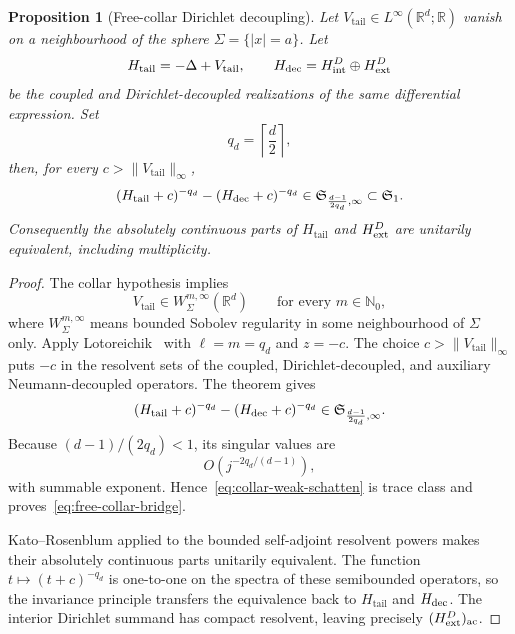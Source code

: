 \documentclass[11pt]{article}
\newcommand{\R}{\mathbb R}
\newcommand{\N}{\mathbb N}
\newcommand{\TC}{\mathfrak S_1}
\newcommand{\ac}{\mathrm{ac}}
\newtheorem{proposition}[theorem]{Proposition}
\theoremstyle{definition}
\theoremstyle{remark}
\begin{document}
\begin{proposition}[Free-collar Dirichlet decoupling]\label{prop:free-collar}
Let $V_{\mathrm{tail}}\in L^\infty(\R^d;\R)$ vanish on a neighbourhood of the sphere $\Sigma=\{|x|=a\}$.  Let
\begin{equation}
 H_{\mathrm{tail}}=-\Delta+V_{\mathrm{tail}},
 \qquad
 H_{\rm dec}=H_{\rm int}^D\oplus H_{\rm ext}^D
 \label{eq:free-collar-operators}
\end{equation}
be the coupled and Dirichlet-decoupled realizations of the same differential expression.  Set
\begin{equation}
 q_d=\left\lceil\frac d2\right\rceil,
 \label{eq:free-collar-power}
\end{equation}
then, for every $c>\|V_{\mathrm{tail}}\|_\infty$,
\begin{equation}
 (H_{\mathrm{tail}}+c)^{-q_d}-(H_{\rm dec}+c)^{-q_d}
 \in\mathfrak S_{\frac{d-1}{2q_d},\infty}\subset\TC.
 \label{eq:free-collar-bridge}
\end{equation}
Consequently the absolutely continuous parts of $H_{\mathrm{tail}}$ and $H_{\rm ext}^D$ are unitarily equivalent, including multiplicity.
\end{proposition}

\begin{proof}
The collar hypothesis implies
\begin{equation}
 V_{\mathrm{tail}}\in W_\Sigma^{m,\infty}(\R^d)
 \qquad\text{for every }m\in\N_0,
 \label{eq:collar-local-regularity}
\end{equation}
where $W_\Sigma^{m,\infty}$ means bounded Sobolev regularity in some neighbourhood of $\Sigma$ only.  Apply Lotoreichik~\cite[Theorem~4.17]{Lotoreichik2013} with $\ell=m=q_d$ and $z=-c$.  The choice $c>\|V_{\mathrm{tail}}\|_\infty$ puts $-c$ in the resolvent sets of the coupled, Dirichlet-decoupled, and auxiliary Neumann-decoupled operators.  The theorem gives
\begin{equation}
 (H_{\mathrm{tail}}+c)^{-q_d}-(H_{\rm dec}+c)^{-q_d}
 \in\mathfrak S_{\frac{d-1}{2q_d},\infty}.
 \label{eq:collar-weak-schatten}
\end{equation}
Because $(d-1)/(2q_d)<1$, its singular values are
\begin{equation}
 O\!\left(j^{-2q_d/(d-1)}\right),
 \end{equation}
with summable exponent.  Hence~\eqref{eq:collar-weak-schatten} is trace class and proves~\eqref{eq:free-collar-bridge}.

Kato--Rosenblum applied to the bounded self-adjoint resolvent powers makes their absolutely continuous parts unitarily equivalent.  The function $t\mapsto(t+c)^{-q_d}$ is one-to-one on the spectra of these semibounded operators, so the invariance principle transfers the equivalence back to $H_{\mathrm{tail}}$ and $H_{\rm dec}$.  The interior Dirichlet summand has compact resolvent, leaving precisely $(H_{\rm ext}^D)_{\ac}$.
\end{proof}
\end{document}
